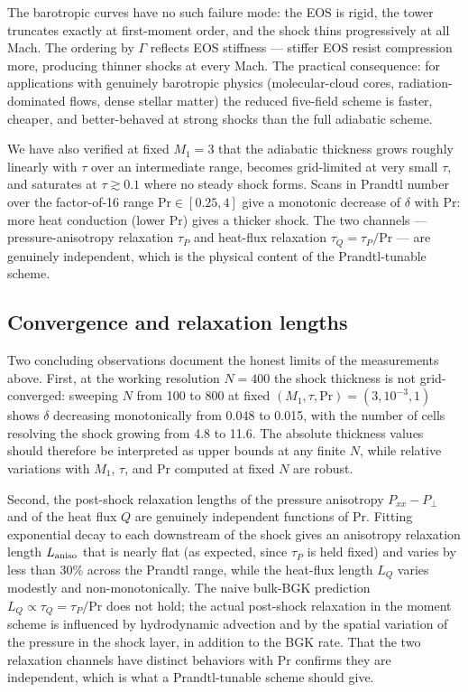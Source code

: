 \documentclass[11pt,letterpaper]{article}
\begin{document}
The barotropic curves have no such failure mode: the EOS is rigid, the tower truncates exactly at first-moment order, and the shock thins progressively at all Mach. The ordering by $\Gamma$ reflects EOS stiffness --- stiffer EOS resist compression more, producing thinner shocks at every Mach. The practical consequence: for applications with genuinely barotropic physics (molecular-cloud cores, radiation-dominated flows, dense stellar matter) the reduced five-field scheme is faster, cheaper, and better-behaved at strong shocks than the full adiabatic scheme.

We have also verified at fixed $M_1 = 3$ that the adiabatic thickness grows roughly linearly with $\tau$ over an intermediate range, becomes grid-limited at very small $\tau$, and saturates at $\tau \gtrsim 0.1$ where no steady shock forms. Scans in Prandtl number over the factor-of-16 range $\mathrm{Pr} \in [0.25, 4]$ give a monotonic decrease of $\delta$ with $\mathrm{Pr}$: more heat conduction (lower $\mathrm{Pr}$) gives a thicker shock. The two channels --- pressure-anisotropy relaxation $\tau_P$ and heat-flux relaxation $\tau_Q = \tau_P/\mathrm{Pr}$ --- are genuinely independent, which is the physical content of the Prandtl-tunable scheme.

\subsection{Convergence and relaxation lengths}

Two concluding observations document the honest limits of the measurements above. First, at the working resolution $N = 400$ the shock thickness is not grid-converged: sweeping $N$ from 100 to 800 at fixed $(M_1, \tau, \mathrm{Pr}) = (3, 10^{-3}, 1)$ shows $\delta$ decreasing monotonically from 0.048 to 0.015, with the number of cells resolving the shock growing from 4.8 to 11.6. The absolute thickness values should therefore be interpreted as upper bounds at any finite $N$, while relative variations with $M_1$, $\tau$, and $\mathrm{Pr}$ computed at fixed $N$ are robust.

Second, the post-shock relaxation lengths of the pressure anisotropy $P_{xx} - P_\perp$ and of the heat flux $Q$ are genuinely independent functions of $\mathrm{Pr}$. Fitting exponential decay to each downstream of the shock gives an anisotropy relaxation length $L_{\rm aniso}$ that is nearly flat (as expected, since $\tau_P$ is held fixed) and varies by less than 30\% across the Prandtl range, while the heat-flux length $L_Q$ varies modestly and non-monotonically. The naive bulk-BGK prediction $L_Q \propto \tau_Q = \tau_P/\mathrm{Pr}$ does not hold; the actual post-shock relaxation in the moment scheme is influenced by hydrodynamic advection and by the spatial variation of the pressure in the shock layer, in addition to the BGK rate. That the two relaxation channels have distinct behaviors with $\mathrm{Pr}$ confirms they are independent, which is what a Prandtl-tunable scheme should give.
\end{document}
